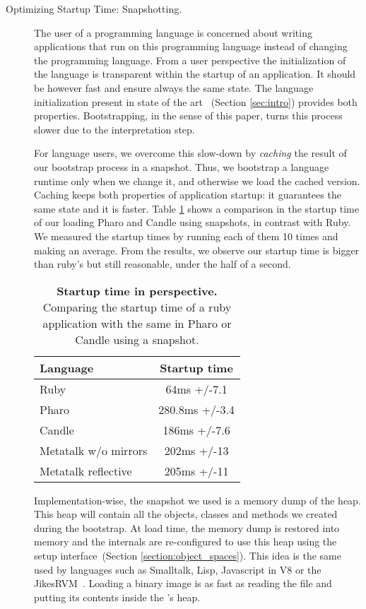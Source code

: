 \begin{description}
\item[Optimizing Startup Time: Snapshotting.]\label{sec:snapshot}
The user of a programming language is concerned about writing applications that run on this programming language instead of changing the programming language. From a user perspective the initialization of the language is transparent within the startup of an application. It should be however fast and ensure always the same state.
The language initialization present in state of the art \VMs~(Section \ref{sec:intro}) provides both properties. Bootstrapping, in the sense of this paper, turns this process slower due to the interpretation step.

For language users, we overcome this slow-down by \emph{caching} the result of our bootstrap process in a snapshot. Thus, we bootstrap a language runtime only when we change it, and otherwise we load the cached version. Caching keeps both properties of application startup: it guarantees the same state and it is faster. Table \ref{tb:startup} shows a comparison in the startup time of our \VM loading Pharo and Candle using snapshots, in contrast with Ruby. We measured the startup times by running each of them 10 times and making an average. From the results, we observe our startup time is bigger than ruby's but still reasonable, under the half of a second.

 \begin{table}[ht]
 \small
 	\centering
 	\begin{tabular}{|l|c|}
			\hline
			\textbf{Language}
 			& \textbf{Startup time}\\
		\hline
		Ruby &  64ms +/-7.1\\\hline
		Pharo & 280.8ms +/-3.4\\\hline
		Candle & 186ms +/-7.6\\\hline
		Metatalk w/o mirrors &202ms +/-13\\\hline
		Metatalk reflective &205ms +/-11\\\hline
 	\end{tabular}
	\vspace*{0.2cm}
 	\caption{\small\textbf{Startup time in perspective.} Comparing the startup time of a ruby application with the same in Pharo or Candle using a snapshot.\label{tb:startup}}
 \end{table}

Implementation-wise, the snapshot we used is a memory dump of the \VM heap. This heap will contain all the objects, classes and methods we created during the bootstrap. At load time, the memory dump is restored into memory and the \VM internals are re-configured to use this heap using the \VM setup interface~(Section \ref{section:object_spaces}). This idea is the same used by languages such as Smalltalk, Lisp, Javascript in V8 or the JikesRVM~\cite{Alpe00a}. Loading a binary image is as fast as reading the file and putting its contents inside the \VM's heap.

\end{description}

